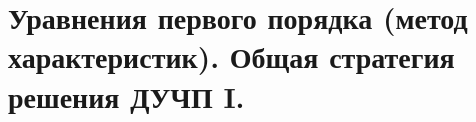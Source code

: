 \chapter{Уравнения первого порядка (метод характеристик). Общая стратегия
решения ДУЧП I.}

\newpage
